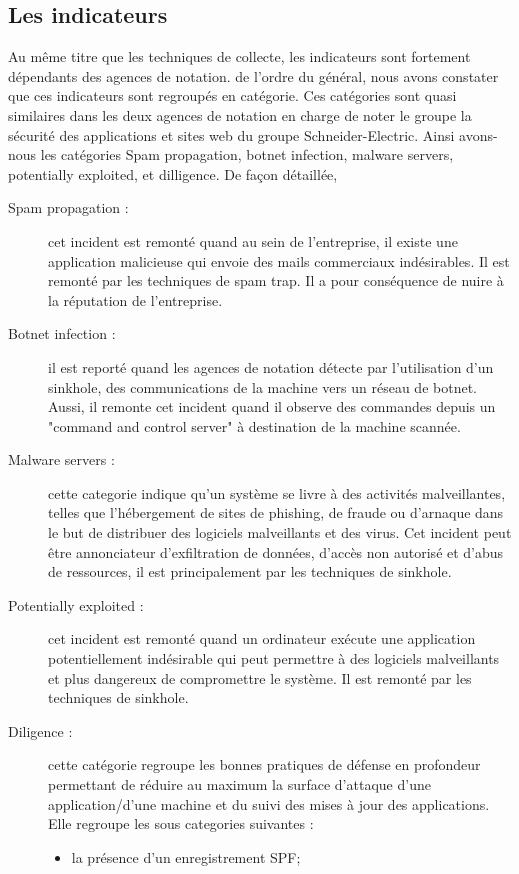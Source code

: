 \documentclass[a4paper,12pt]{book}
\theoremstyle{break}
\begin{document}
\subsection{Les indicateurs}
Au même titre que les techniques de collecte, les indicateurs  sont fortement dépendants des agences de notation. de l'ordre du général, nous avons constater que ces indicateurs sont regroupés en catégorie. Ces catégories sont quasi similaires dans les deux agences de notation en charge de noter le groupe la sécurité des applications et sites web du groupe Schneider-Electric.
Ainsi avons-nous les catégories Spam propagation, botnet infection, malware servers, potentially exploited, et dilligence. 
De façon détaillée, 
\begin{description}
    \item[Spam propagation :]cet incident est remonté quand au sein de l’entreprise, il existe une application malicieuse qui envoie des mails commerciaux indésirables. Il est remonté par les techniques de spam trap. Il a pour conséquence de nuire à la réputation de l’entreprise.  
    \item[Botnet infection :] il est reporté quand les agences de notation détecte par l’utilisation d’un sinkhole, des communications de la machine vers un réseau de botnet. Aussi, il remonte cet incident quand il observe des commandes depuis un "command and control server" à destination de la machine scannée. 
    \item[Malware servers :] cette categorie indique qu'un système se livre à des activités malveillantes, telles que l'hébergement de sites de phishing, de fraude ou d'arnaque dans le but de distribuer des logiciels malveillants et des virus. Cet incident peut être annonciateur d’exfiltration de données, d’accès non autorisé et d’abus de ressources, il est principalement par les techniques de sinkhole.  
    \item[Potentially exploited :] cet incident est remonté quand un ordinateur exécute une application potentiellement indésirable qui peut permettre à des logiciels malveillants et plus dangereux de compromettre le système. Il est remonté par les techniques de sinkhole.
    \item [Diligence :]cette catégorie regroupe les bonnes pratiques de défense en profondeur permettant de réduire au maximum la surface d’attaque d’une application/d’une machine et du suivi des mises à jour des applications. Elle regroupe les sous categories suivantes :
    \begin{itemize}
        \item la présence d’un enregistrement SPF;

\end{itemize}
\end{description}
\end{document}
